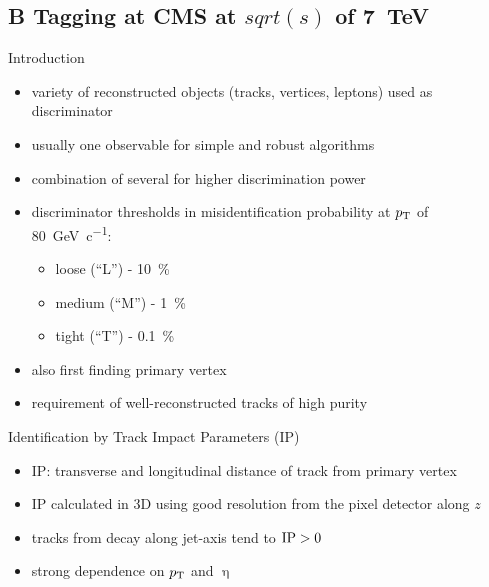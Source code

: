\subsection{B Tagging at CMS at $sqrt(s)$ of \SI{7}{\tera\electronvolt}}
\begin{frame}{Introduction}
	
	\begin{itemize}\itemfill
		\item variety of reconstructed objects (tracks, vertices, leptons) used as discriminator
		\item usually one observable for simple and robust algorithms 
		\item combination of several for higher discrimination power
		\item discriminator thresholds in misidentification probability at $p_{\text{T}}$ of \SI{80}{\giga\electronvolt\per c}:
		\begin{itemize}
			\item loose (``L'') - \SI{10}{\%}
			\item medium (``M'') - \SI{1}{\%}
			\item tight (``T'') - \SI{.1}{\%}
		\end{itemize}
		\item also first finding primary vertex 
		\item requirement of well-reconstructed tracks of high purity
	\end{itemize}

\end{frame}
\begin{frame}{Identification by Track Impact Parameters (IP)}

	\begin{minipage}[c][.4\textheight]{.6\textwidth}
		\begin{itemize}\itemfill
		\item IP: transverse and longitudinal distance of track from primary vertex
		\item IP calculated in 3D using good resolution from the pixel detector along $z$
		\item tracks from decay along jet-axis \ra tend to $\text{IP}>0$
		\item strong dependence on $p_{\text{T}}$ and $\upeta$
		\end{itemize}
	\end{minipage}
	\begin{minipage}{.38\textwidth}
	\end{minipage}
	

\end{frame}

